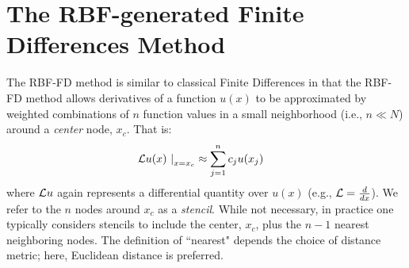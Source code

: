 \documentclass[11pt]{report}
\begin{document}
{%
%
%
%




\section{The RBF-generated Finite Differences Method}
The RBF-FD method is similar to classical Finite Differences in that the RBF-FD method allows derivatives of a function $u(x)$ to be approximated by weighted combinations of $n$ function values in a small neighborhood (i.e., $n \ll N$) around a \emph{center} node, $x_c$. That is: 
        \begin{align} 
        \left. \mathcal{L}u(x) \ \right|_{x = x_c} &\approx \sum_{j=1}^{n} c_j u(x_j) \nonumber 
        \label{eq:derivFromFDWeights}
        \end{align}
where $\mathcal{L}u$ again represents a differential quantity over $u(x)$ (e.g., $\mathcal{L} = \frac{d }{d x}$). We refer to the $n$ nodes around $x_c$ as a \emph{stencil}. While not necessary, in practice one typically considers stencils to include the center, $x_c$, plus the $n - 1$ nearest neighboring nodes. The definition of ``nearest" depends the choice of distance metric; here, Euclidean distance is preferred. 

}
\end{document}
